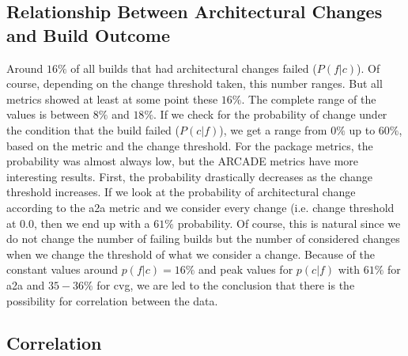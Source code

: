 \documentclass[sigplan, anonymous, review]{acmart}
\begin{document}
\subsection{Relationship Between Architectural Changes and Build Outcome}

Around $16\%$ of all builds that had architectural changes failed ($P(f|c)$). Of course, depending on the change threshold taken, this number ranges. But all metrics showed at least at some point these $16\%$. The complete range of the values is between $8\%$ and $18\%$. 
If we check for the probability of change under the condition that the build failed ($P(c|f)$), we get a range from $0\%$ up to $60\%$, based on the metric and the change threshold. For the package metrics, the probability was almost always low, but the ARCADE metrics have more interesting results. First, the probability drastically decreases as the change threshold increases. If we look at the probability of architectural change according to the a2a metric and we consider every change (i.e. change threshold at $0.0$, then we end up with a $61\%$ probability. Of course, this is natural since we do not change the number of failing builds but the number of considered changes when we change the threshold of what we consider a change. 
Because of the constant values around $p(f|c) = 16\%$ and peak values for $p(c|f)$ with $61\%$ for a2a and $35-36\%$ for cvg, we are led to the conclusion that there is the possibility for correlation between the data.

\subsection{Correlation}


\end{document}
